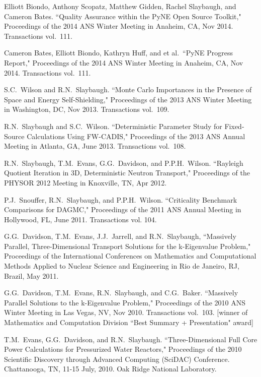 \begin{bibsection}
\item Elliott Biondo, Anthony Scopatz, Matthew Gidden, Rachel Slaybaugh, and Cameron Bates. ``Quality Assurance within the PyNE Open Source Toolkit,"  Proceedings of the 2014 ANS Winter Meeting in Anaheim, CA, Nov 2014. Transactions vol.\ 111.

\item Cameron Bates, Elliott Biondo, Kathryn Huff, and et al.\ ``PyNE Progress Report," Proceedings of the 2014 ANS Winter Meeting in Anaheim, CA, Nov 2014. Transactions vol.\ 111.

\item S.C.\ Wilson and R.N.\ Slaybaugh. ``Monte Carlo Importances in the Presence of Space and Energy Self-Shielding," Proceedings of the 2013 ANS Winter Meeting in Washington, DC, Nov 2013. Transactions vol.\ 109.

\item R.N.\ Slaybaugh and  S.C.\ Wilson. ``Deterministic Parameter Study for Fixed-Source Calculations Using FW-CADIS," Proceedings of the 2013 ANS Annual Meeting in Atlanta, GA, June 2013. Transactions vol.\ 108.

\item R.N.\ Slaybaugh, T.M.\ Evans, G.G.\ Davidson, and P.P.H.\ Wilson. ``Rayleigh Quotient Iteration in 3D, Deterministic Neutron Transport," Proceedings of the PHYSOR 2012 Meeting in Knoxville, TN, Apr 2012.

\item P.J.\ Snouffer, R.N.\ Slaybaugh, and P.P.H.\ Wilson. ``Criticality Benchmark Comparisons for DAGMC," Proceedings of the 2011 ANS Annual Meeting in Hollywood, FL, June 2011. Transactions vol. 104.

\item G.G.\ Davidson, T.M.\ Evans, J.J.\ Jarrell, and R.N.\ Slaybaugh, ``Massively Parallel, Three-Dimensional Transport Solutions for the k-Eigenvalue Problem," Proceedings of the International Conferences on Mathematics and Computational Methods Applied to Nuclear Science and Engineering in Rio de Janeiro, RJ, Brazil, May 2011.

\item G.G.\ Davidson, T.M.\ Evans, R.N.\ Slaybaugh, and C.G.\ Baker.  ``Massively Parallel Solutions to the k-Eigenvalue Problem," Proceedings of the 2010 ANS Winter Meeting in Las Vegas, NV, Nov 2010. Transactions vol.\ 103. [winner of Mathematics and Computation Division ``Best Summary + Presentation" award]

\item T.M.\ Evans, G.G.\ Davidson, and R.N.\ Slaybaugh.  ``Three-Dimensional Full Core Power Calculations for Pressurized Water Reactors," Proceedings of the 2010 Scientific Discovery through Advanced Computing (SciDAC) Conference. Chattanooga, TN, 11-15 July, 2010. Oak Ridge National Laboratory.


\end{bibsection}
